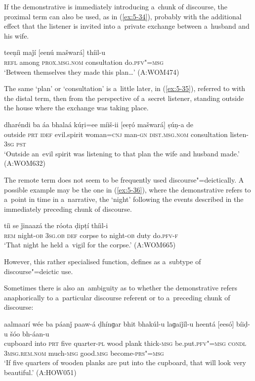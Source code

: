 If the demonstrative is immediately introducing a~chunk of discourse, the proximal term can also be used, as in (\ref{ex:5-34}), probably with the additional effect that the listener is invited into a~private exchange between a~husband and his wife.
\begin{exe}
\ex
\label{ex:5-34}
\gll teeṇíi maǰí [eenú mašwará] thíil-u \\
\textsc{refl} among \textsc{prox.msg.nom} consultation do.\textsc{pfv"=msg}\\
\glt `Between themselves they made this plan{\ldots}' (A:WOM474)
\end{exe}
The same `plan' or `consultation' is a~little later, in (\ref{ex:5-35}), referred to with the distal term, then from the perspective of a~secret listener, standing outside the house where the exchange was taking place.
\begin{exe}
\ex
\label{ex:5-35}
\gll dharéndi ba áa bhalaá kúṛi=ee míiš-ii [eeṛó mašwará] ṣúṇ-a de \\
outside \textsc{prt} \textsc{idef} evil.spirit woman=\textsc{cnj} man-\textsc{gn} \textsc{dist.msg.nom} consultation listen-\textsc{3sg} \textsc{pst} \\
\glt `Outside an~evil spirit was listening to that plan the wife and husband made.' (A:WOM632)
\end{exe}
The remote term does not seem to be frequently used discourse"=deictically. A possible example may be the one in (\ref{ex:5-36}), where the demonstrative refers to a~point in time in a~narrative, the `night' following the events described in the immediately preceding chunk of discourse.
\begin{exe}
\ex
\label{ex:5-36}
 tíi se ǰinaazá the róota ḍipṭí thíil-i\\
\textsc{rem} night-\textsc{ob} \textsc{3sg.ob} \textsc{def} corpse to night-\textsc{ob} duty do.\textsc{pfv-f}\\
\glt `That night he held a~vigil for the corpse.' (A:WOM665)
\end{exe}
However, this rather specialised function, \citet[225]{himmelmann1996} defines as a~subtype of discourse"=deictic use.

Sometimes there is also an~ambiguity as to whether the demonstrative refers anaphorically to a~particular discourse referent or to a~preceding chunk of discourse:

\begin{exe}
\ex
\label{ex:5-37}
\gll aalmaarí wée ba páanǰ paaw-á ḍhínɡar bhit bhakúl-u laɡaiǰíl-u heentá [eesó] bíiḍ-u šóo bh-áan-u \\
cupboard into \textsc{prt} five quarter-\textsc{pl} wood plank thick-\textsc{msg} be.put.\textsc{pfv"=msg} \textsc{condl} \textsc{3msg.rem.nom} much-\textsc{msg} good.\textsc{msg} become-\textsc{prs"=msg}\\
\glt `If five quarters of wooden planks are put into the cupboard, that will look very beautiful.'
(A:HOW051)
\end{exe}

